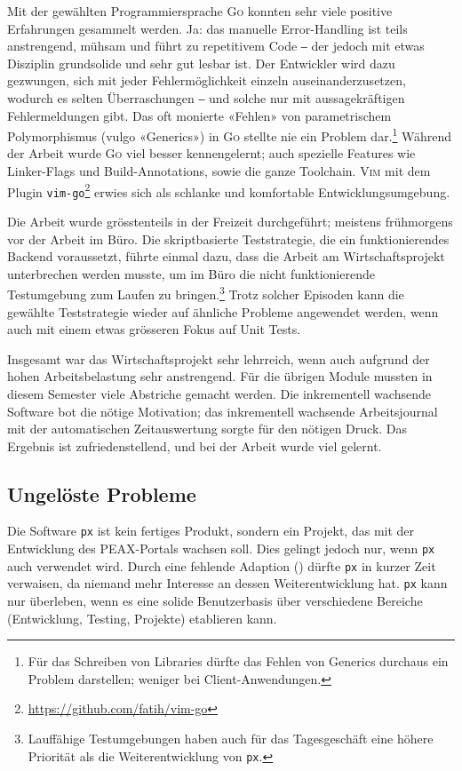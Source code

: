 Mit der gewählten Programmiersprache \textsc{Go} konnten sehr viele positive Erfahrungen gesammelt werden. Ja: das manuelle Error-Handling ist teils anstrengend, mühsam und führt zu repetitivem Code ‒ der jedoch mit etwas Disziplin grundsolide und sehr gut lesbar ist. Der Entwickler wird dazu gezwungen, sich mit jeder Fehlermöglichkeit einzeln auseinanderzusetzen, wodurch es selten Überraschungen ‒ und solche nur mit aussagekräftigen Fehlermeldungen gibt. Das oft monierte «Fehlen» von parametrischem Polymorphismus (vulgo «Generics») in \textsc{Go} stellte nie ein Problem dar.\footnote{Für das Schreiben von Libraries dürfte das Fehlen von Generics durchaus ein Problem darstellen; weniger bei Client-Anwendungen.} Während der Arbeit wurde \textsc{Go} viel besser kennengelernt; auch spezielle Features wie Linker-Flags und Build-Annotations, sowie die ganze Toolchain. \textsc{Vim} mit dem Plugin \texttt{vim-go}\footnote{\url{https://github.com/fatih/vim-go}} erwies sich als schlanke und komfortable Entwicklungsumgebung.

Die Arbeit wurde grösstenteils in der Freizeit durchgeführt; meistens frühmorgens vor der Arbeit im Büro. Die skriptbasierte Teststrategie, die ein funktionierendes Backend voraussetzt, führte einmal dazu, dass die Arbeit am Wirtschaftsprojekt unterbrechen werden musste, um im Büro die nicht funktionierende Testumgebung zum Laufen zu bringen.\footnote{Lauffähige Testumgebungen haben auch für das Tagesgeschäft eine höhere Priorität als die Weiterentwicklung von \texttt{px}.} Trotz solcher Episoden kann die gewählte Teststrategie wieder auf ähnliche Probleme angewendet werden, wenn auch mit einem etwas grösseren Fokus auf Unit Tests.

Insgesamt war das Wirtschaftsprojekt sehr lehrreich, wenn auch aufgrund der hohen Arbeitsbelastung sehr anstrengend. Für die übrigen Module mussten in diesem Semester viele Abstriche gemacht werden. Die inkrementell wachsende Software bot die nötige Motivation; das inkrementell wachsende Arbeitsjournal mit der automatischen Zeitauswertung sorgte für den nötigen Druck. Das Ergebnis ist zufriedenstellend, und bei der Arbeit wurde viel gelernt.

\subsection{Ungelöste Probleme}

Die Software \texttt{px} ist kein fertiges Produkt, sondern ein Projekt, das mit der Entwicklung des PEAX-Portals wachsen soll. Dies gelingt jedoch nur, wenn \texttt{px} auch verwendet wird. Durch eine fehlende Adaption () dürfte \texttt{px} in kurzer Zeit verwaisen, da niemand mehr Interesse an dessen Weiterentwicklung hat. \texttt{px} kann nur überleben, wenn es eine solide Benutzerbasis über verschiedene Bereiche (Entwicklung, Testing, Projekte) etablieren kann.

